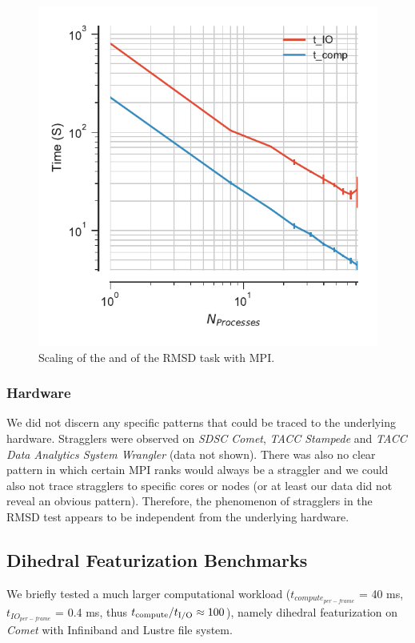 \begin{figure}[ht!]
\centering
  \includegraphics[width=0.4\linewidth]{figures/main-RMSD-time_comp_IO_comparison.pdf}
\caption{Scaling of the \tcomp and \tIO of the RMSD task with MPI.}
\label{fig:ScalingComputeIO}
\end{figure}

\subsubsection*{Hardware}

We did not discern any specific patterns that could be traced to the underlying hardware. Stragglers were observed on \emph{SDSC Comet},
\emph{TACC Stampede} and \emph{TACC Data Analytics System Wrangler} (data not shown). There was also no clear pattern in which certain MPI
ranks would always be a straggler and we could also not trace stragglers to specific cores or nodes (or at least our data did not
reveal an obvious pattern). Therefore, the phenomenon of stragglers in the RMSD test appears to be independent from the underlying hardware.

\subsection{Dihedral Featurization Benchmarks}
\label{DF}
We briefly tested a much larger computational workload ($t_{compute_{per-frame}}$ = 40 ms, $t_{IO_{per-frame}}$ = 0.4 ms, thus ${t}_{\text{compute}}/{t}_{\text{I/O}} \approx 100$), namely dihedral
featurization on \emph{Comet} with Infiniband and Lustre file system.

